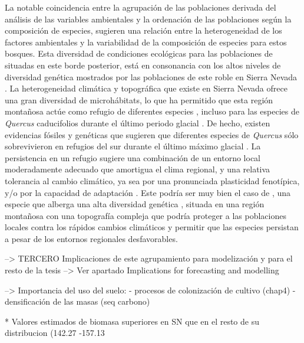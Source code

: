La notable coincidencia entre la agrupación de las poblaciones derivada del análisis de las variables ambientales y la ordenación de las poblaciones según la composición de especies, sugieren una relación entre la heterogeneidad de los factores ambientales y la variabilidad de la composición de especies para estos bosques. Esta diversidad de condiciones ecológicas para las poblaciones de \Qp situadas en este borde posterior, está en consonancia con los altos niveles de diversidad genética mostrados por las poblaciones de este roble en Sierra Nevada \autocites{ValbuenaCarabanaGil2013GeneticResilience, ValbuenaCarabanaGil2017CentenaryCoppicing}. La heterogeneidad climática y topográfica que existe en Sierra Nevada ofrece una gran diversidad de microhábitats, lo que ha permitido que esta región montañosa actúe como refugio de diferentes especies \autocites{MedailDiadema2009GlacialRefugia, GomezLunt2007RefugiaRefugia,BlancoPastoretal2019TopographyExplains}, incluso para las especies de \emph{Quercus} caducifolios durante el último periodo glacial \autocites{Breweretal2002SpreadDeciduous, Olaldeetal2002WhiteOaks,RodriguezSanchezetal2010TreeRange}. De hecho, existen evidencias fósiles y genéticas que sugieren que diferentes especies de \emph{Quercus} sólo sobrevivieron en refugios del sur durante el último máximo glacial \autocite{Breweretal2002SpreadDeciduous,Petitetal2002IdentificationRefugia,BhagwatWillis2008SpeciesPersistence,BirksWillis2008AlpinesTrees}. La persistencia en un refugio sugiere una combinación de un entorno local moderadamente adecuado que amortigua el clima regional, y una relativa tolerancia al cambio climático, ya sea por una pronunciada plasticidad fenotípica, y/o por la capacidad de adaptación \autocites{Gavinetal2014ClimateRefugia}. Este podría ser muy bien el caso de \Qp, una especie que alberga una alta diversidad genética \autocite{ValbuenaCarabanaGil2013GeneticResilience}, situada en una región montañosa con una topografía compleja que podría proteger a las poblaciones locales contra los rápidos cambios climáticos y permitir que las especies persistan a pesar de los entornos regionales desfavorables.


--> TERCERO Implicaciones de este agrupamiento para modelización y para el resto de la tesis
--> Ver apartado Implications for forecasting and modelling 

--> Importancia del uso del suelo: 
- procesos de colonización de cultivo (chap4)
- densificación de las masas (seq carbono)

* Valores estimados de biomasa  superiores en SN que en el resto de su distribucion (142.27 -157.13 \mgha 

